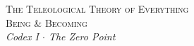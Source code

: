 \documentclass[10pt, openany, oneside]{book}
\renewcommand{\normalsize}{\fontsize{10}{13}\selectfont}
\begin{document}

\thispagestyle{empty}
\vspace*{\fill}
\begin{center}
    {\normalsize\scshape The Teleological Theory of Everything}\\[1.5em]
    {\fontsize{24}{28}\selectfont\scshape Being \& Becoming}\\[0.8em]
    {\normalsize\itshape Codex I $\cdot$ The Zero Point}
\end{center}
\vspace*{\fill}
\newpage

\end{document}
